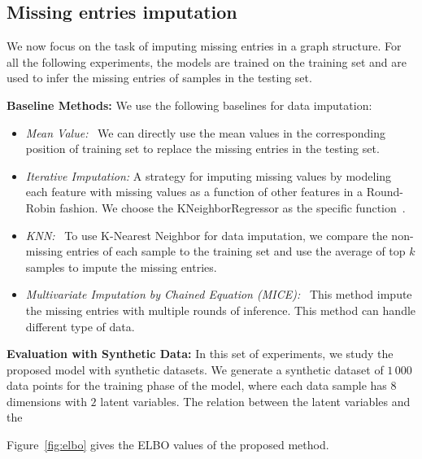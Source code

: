 \documentclass{article} %
\newcommand{\belhal}[1]{{\color{red}{\bf\sf [BK: #1]}}}
\begin{document}
\vspace{-0.05in}
\subsection{Missing entries imputation}
\vspace{-0.05in}
We now focus on the task of imputing missing entries in a graph structure.
For all the following experiments, the models are trained on the training set and are used to infer the missing entries of samples in the testing set.

\textbf{Baseline Methods:} We use the following baselines for data imputation:
\begin{itemize}
\item \textit{Mean Value:} \ We can directly use the mean values in the corresponding position of training set to replace the missing entries in the testing set.  
\item \textit{Iterative Imputation:} A strategy for imputing missing values by modeling each feature with missing values as a function of other features in a Round-Robin fashion. We choose the KNeighborRegressor as the specific function~\citep{scikit-learn}.
\item \textit{KNN:} \  To use K-Nearest Neighbor for data imputation,  we compare the non-missing entries of each sample to the training set and use the  average of top $k$ samples to impute the missing entries. 
\item \textit{Multivariate Imputation by Chained Equation (MICE):} \ This method impute the missing entries with multiple  rounds of inference. This method can handle different type of data.
\end{itemize}
\textbf{Evaluation with Synthetic Data: }
In this set of experiments, we study the proposed model with synthetic datasets.
We generate a synthetic dataset of $1\,000$ data points for the training phase of the model, where each data sample  has $8$ dimensions with $2$ latent variables.  The relation between the latent variables and the \belhal{to complete}


Figure~\ref{fig:elbo} gives the ELBO values of the proposed method. 
\end{document}
